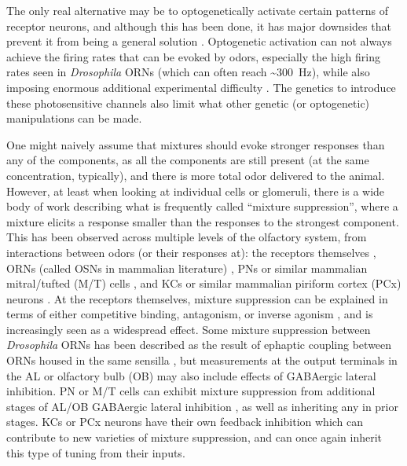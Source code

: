 \documentclass[12pt]{caltech_thesis}
\renewcommand{\cite}{{ }\autocite}
\begin{document}
\begin{refsection}
The only real alternative may be to optogenetically activate certain patterns of receptor neurons, and although this has been done, it has major downsides that prevent it from being a general solution\cite{Jeanne2018,Chong2020}.
Optogenetic activation can not always achieve the firing rates that can be evoked by odors, especially the high firing rates seen in \textit{Drosophila} ORNs (which can often reach \textasciitilde\qty{300}{\hertz}), while also imposing enormous additional experimental difficulty\cite{Fişek2021}.
The genetics to introduce these photosensitive channels also limit what other genetic (or optogenetic) manipulations can be made.

One might naively assume that mixtures should evoke stronger responses than any of the components, as all the components are still present (at the same concentration, typically), and there is more total odor delivered to the animal. 
However, at least when looking at individual cells or glomeruli, there is a wide body of work describing what is frequently called ``mixture suppression'', where a mixture elicits a response smaller than the responses to the strongest component\footnotemark[1]{}.
This has been observed across multiple levels of the olfactory system, from interactions between odors (or their responses at): the receptors themselves\cite{ORNLinearMixWithInh,CompetitiveBinding,ReceptorInh2,ReceptorInh3,DiverseORInteractions,Zak2020}, ORNs (called OSNs in mammalian literature) \cite{DuchampViret2003,EphapticSensillaInh,Xu2020,Wu2022}, PNs or similar mammalian mitral/tufted (M/T) cells\cite{Davison2007,Silbering2007,Mohamed2019}, and KCs or similar mammalian piriform cortex (PCx) neurons\cite{PiriformMixSupp,Rokni2020}.
At the receptors themselves, mixture suppression can be explained in terms of either competitive binding, antagonism, or inverse agonism\cite{MurthyAntagonism,CompetitiveBinding,Inagaki2020}, and is increasingly seen as a widespread effect.
Some mixture suppression between \textit{Drosophila} ORNs has been described as the result of ephaptic coupling between ORNs housed in the same sensilla\cite{EphapticSensillaInh,Wu2022}, but measurements at the output terminals in the AL or olfactory bulb (OB) may also include effects of GABAergic lateral inhibition.
PN or M/T cells can exhibit mixture suppression from additional stages of AL/OB GABAergic lateral inhibition\cite{Olsen2010}, as well as inheriting any in prior stages.
KCs or PCx neurons have their own feedback inhibition which can contribute to new varieties of mixture suppression, and can once again inherit this type of tuning from their inputs.


\end{refsection}
\end{document}
